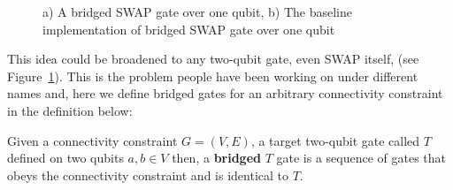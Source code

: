 \begin{figure}[h!]
  \label{fig:bridged-swap-1}
  \centering
  \caption{a) A bridged SWAP gate over one qubit, b) The baseline implementation of bridged SWAP gate over one qubit}
\end{figure}

This idea could be broadened to any two-qubit gate, even SWAP itself, (see Figure~\ref{fig:bridged-swap-1}). This is the problem people have been working on under different names \cite{shende2006} and, here we define bridged gates for an arbitrary connectivity constraint in the definition below:

\begin{definition}
  Given a connectivity constraint $G = (V, E)$, a target two-qubit gate called $T$ defined on two qubits $a, b \in V$ then, a \textbf{bridged} $T$ gate is a sequence of gates that obeys the connectivity constraint and is identical to $T$.
\end{definition}

